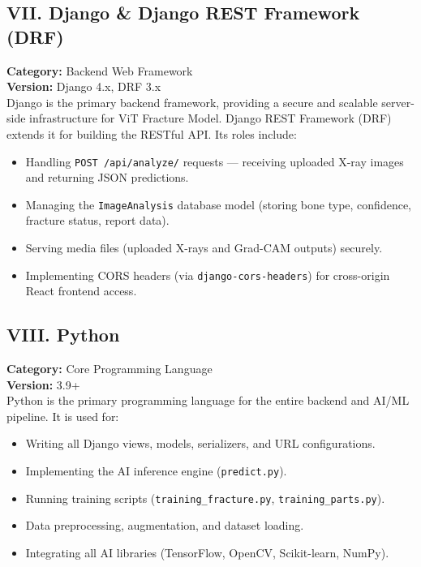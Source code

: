 \documentclass[a4paper,12pt]{report}
\begin{document}
    \subsection*{VII. Django \& Django REST Framework (DRF)}
    \textbf{Category:} Backend Web Framework\\
    \textbf{Version:} Django 4.x, DRF 3.x\\
    Django is the primary backend framework, providing a secure and scalable server-side infrastructure for ViT Fracture Model. Django REST Framework (DRF) extends it for building the RESTful API. Its roles include:
    \begin{itemize}
        \item Handling \texttt{POST /api/analyze/} requests — receiving uploaded X-ray images and returning JSON predictions.
        \item Managing the \texttt{ImageAnalysis} database model (storing bone type, confidence, fracture status, report data).
        \item Serving media files (uploaded X-rays and Grad-CAM outputs) securely.
        \item Implementing CORS headers (via \texttt{django-cors-headers}) for cross-origin React frontend access.
    \end{itemize}

    \subsection*{VIII. Python}
    \textbf{Category:} Core Programming Language\\
    \textbf{Version:} 3.9+\\
    Python is the primary programming language for the entire backend and AI/ML pipeline. It is used for:
    \begin{itemize}
        \item Writing all Django views, models, serializers, and URL configurations.
        \item Implementing the AI inference engine (\texttt{predict.py}).
        \item Running training scripts (\texttt{training\_fracture.py}, \texttt{training\_parts.py}).
        \item Data preprocessing, augmentation, and dataset loading.
        \item Integrating all AI libraries (TensorFlow, OpenCV, Scikit-learn, NumPy).
    \end{itemize}
\end{document}

